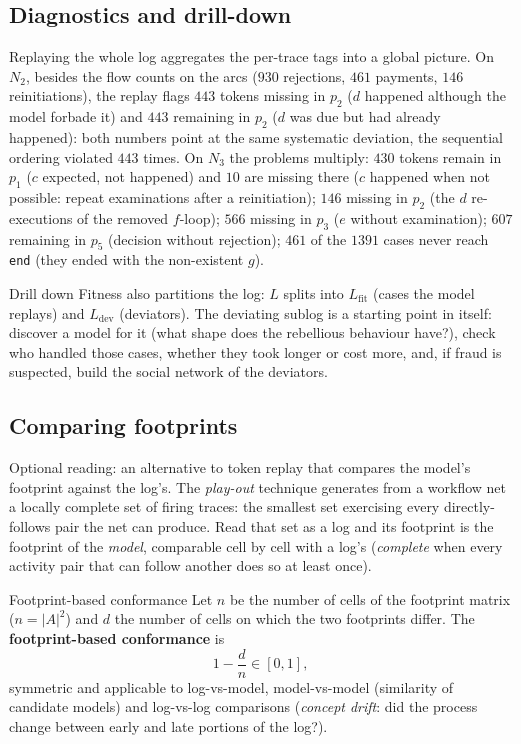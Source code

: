 \subsection{Diagnostics and drill-down}

Replaying the whole log aggregates the per-trace tags into a global picture. On $N_2$, besides the flow counts on the arcs ($930$ rejections, $461$ payments, $146$ reinitiations), the replay flags $443$ tokens missing in $p_2$ ($d$ happened although the model forbade it) and $443$ remaining in $p_2$ ($d$ was due but had already happened): both numbers point at the same systematic deviation, the sequential ordering violated $443$ times. On $N_3$ the problems multiply: $430$ tokens remain in $p_1$ ($c$ expected, not happened) and $10$ are missing there ($c$ happened when not possible: repeat examinations after a reinitiation); $146$ missing in $p_2$ (the $d$ re-executions of the removed $f$-loop); $566$ missing in $p_3$ ($e$ without examination); $607$ remaining in $p_5$ (decision without rejection); $461$ of the $1391$ cases never reach \texttt{end} (they ended with the non-existent $g$).
\begin{notebox}{Drill down}
Fitness also partitions the log: $L$ splits into $L_{\text{fit}}$ (cases the model replays) and $L_{\text{dev}}$ (deviators). The deviating sublog is a starting point in itself: discover a model for it (what shape does the rebellious behaviour have?), check who handled those cases, whether they took longer or cost more, and, if fraud is suspected, build the social network of the deviators.
\end{notebox}

\subsection{Comparing footprints}

Optional reading: an alternative to token replay that compares the model's footprint against the log's. The \emph{play-out} technique generates from a workflow net a locally complete set of firing traces: the smallest set exercising every directly-follows pair the net can produce. Read that set as a log and its footprint is the footprint of the \emph{model}, comparable cell by cell with a log's (\emph{complete} when every activity pair that can follow another does so at least once).
\begin{definitionbox}{Footprint-based conformance}
Let $n$ be the number of cells of the footprint matrix ($n = |A|^2$) and $d$ the number of cells on which the two footprints differ. The \textbf{footprint-based conformance} is
\[1 - \frac{d}{n} \in [0,1],\]
symmetric and applicable to log-vs-model, model-vs-model (similarity of candidate models) and log-vs-log comparisons (\emph{concept drift}: did the process change between early and late portions of the log?).
\end{definitionbox}

